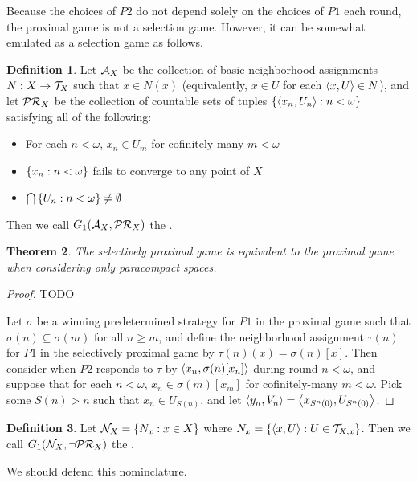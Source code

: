 \documentclass{amsart}
\newtheorem{theorem}{Theorem}[section]
\theoremstyle{definition}
\newtheorem{definition}[theorem]{Definition}
\begin{document}
Because the choices of \(P2\) do not depend solely on the choices of
\(P1\) each round, the proximal game is not a selection game.
However, it can be somewhat emulated as a selection game as follows.

\begin{definition}
Let \(\mathcal{A}_X\) be the collection of basic neighborhood assignments
\(N:X\to\mathcal{T}_X\) such that \(x\in N(x)\) (equivalently,
\(x\in U\) for each \(\left\langle x,U\right\rangle\in N\)), and let \(\mathcal{PR}_X\) 
be the collection of countable sets of tuples \(\left\{\left\langle x_n,U_n\right\rangle:n<\omega\right\}\)
satisfying all of the following:
\begin{itemize}
\item For each \(n<\omega\), \(x_n\in U_m\) for cofinitely-many \(m<\omega\)
\item \(\left\{x_n:n<\omega\right\}\) fails to converge to any point of \(X\)
\item \(\bigcap\left\{U_n:n<\omega\right\}\not=\emptyset\)
\end{itemize}
Then we call \(G_{1}(\mathcal{A}_X,\mathcal{PR}_X)\) the .
\end{definition}

\begin{theorem}
The selectively proximal game is equivalent to the proximal game when
considering only paracompact spaces.
\end{theorem}
\begin{proof}
TODO

Let \(\sigma\) be a winning predetermined strategy for \(P1\) in the proximal game
such that \(\sigma(n)\subseteq\sigma(m)\) for all \(n\geq m\),
and define the neighborhood assignment
\(\tau(n)\) for \(P1\) in the selectively proximal game 
by \(\tau(n)(x)=\sigma(n)[x]\). Then consider when \(P2\) responds to \(\tau\) 
by \(\left\langle x_n,\sigma(n)[x_n]\right\rangle\) during round \(n<\omega\), and
suppose that for each \(n<\omega\), \(x_n\in \sigma(m)[x_m]\) for cofinitely-many \(m<\omega\).
Pick some \(S(n)>n\) such that \(x_n\in U_{S(n)}\), and let 
\(\left\langle y_n,V_n\right\rangle=\left\langle x_{S^n(0)},U_{S^n(0)}\right\rangle\).
\end{proof}

\begin{definition}
Let \(\mathcal{N}_X=\left\{N_x:x\in X\right\}\) where \(N_x=\left\{\left\langle x,U\right\rangle:U\in\mathcal{T}_{X,x}\right\}\).
Then we call \(G_{1}(\mathcal{N}_X,\neg\mathcal{PR}_X)\) the .
\end{definition}

We should defend this nominclature.
\end{document}
